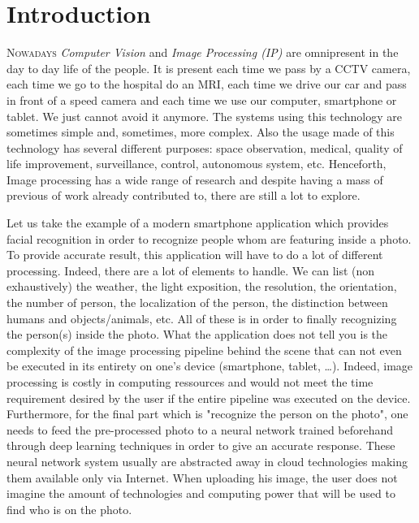 \chapter*{Introduction}
\label{introduction.chap.introduction}

\lettrine[lines=2]{N}{owadays} \emph{Computer Vision} and \emph{Image Processing (IP)} are omnipresent in the day to day
life of the people. It is present each time we pass by a CCTV camera, each time we go to the hospital do an MRI, each
time we drive our car and pass in front of a speed camera and each time we use our computer, smartphone or tablet. We
just cannot avoid it anymore. The systems using this technology are sometimes simple and, sometimes, more complex. Also
the usage made of this technology has several different purposes: space observation, medical, quality of life
improvement, surveillance, control, autonomous system, etc. Henceforth, Image processing has a wide range of research
and despite having a mass of previous of work already contributed to, there are still a lot to explore.

Let us take the example of a modern smartphone application which provides facial recognition in order to recognize
people whom are featuring inside a photo. To provide accurate result, this application will have to do a lot of
different processing. Indeed, there are a lot of elements to handle. We can list (non exhaustively) the weather, the
light exposition, the resolution, the orientation, the number of person, the localization of the person, the distinction
between humans and objects/animals, etc. All of these is in order to finally recognizing the person(s) inside the photo.
What the application does not tell you is the complexity of the image processing pipeline behind the scene that can not
even be executed in its entirety on one's device (smartphone, tablet, \ldots). Indeed, image processing is costly in
computing ressources and would not meet the time requirement desired by the user if the entire pipeline was executed on
the device. Furthermore, for the final part which is "recognize the person on the photo", one needs to feed the
pre-processed photo to a neural network trained beforehand through deep learning techniques in order to give an accurate
response. These neural network system usually are abstracted away in cloud technologies making them available only via
Internet. When uploading his image, the user does not imagine the amount of technologies and computing power that will
be used to find who is on the photo.

